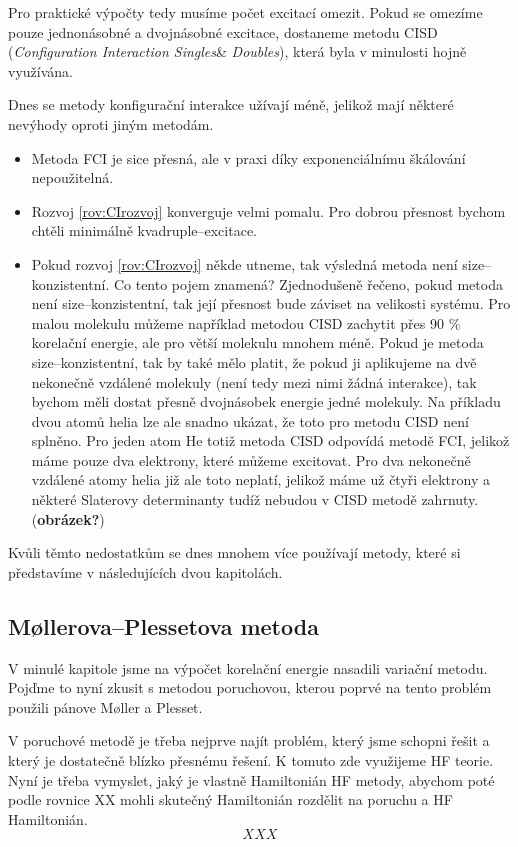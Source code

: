 Pro praktické výpočty tedy musíme počet excitací omezit. Pokud se omezíme pouze jednonásobné a dvojnásobné excitace, dostaneme metodu CISD (\textit{Configuration Interaction Singles}\& \textit{Doubles}), která byla v minulosti hojně využívána.

Dnes se metody konfigurační interakce užívají méně, jelikož mají některé nevýhody oproti jiným metodám. 
\begin{itemize}
\item Metoda FCI je sice přesná, ale v praxi díky exponenciálnímu škálování nepoužitelná.
\item Rozvoj \ref{rov:CIrozvoj} konverguje velmi pomalu. Pro dobrou přesnost bychom chtěli minimálně kvadruple--excitace.
\item Pokud rozvoj \ref{rov:CIrozvoj} někde utneme, tak výsledná metoda není size--konzistentní. Co tento pojem znamená? Zjednodušeně řečeno, pokud metoda není size--konzistentní, tak její přesnost bude záviset na velikosti systému. Pro malou molekulu můžeme například metodou CISD zachytit přes 90 \% korelační energie, ale pro větší molekulu mnohem méně. Pokud je metoda size--konzistentní, tak by také mělo platit, že pokud ji aplikujeme na dvě nekonečně vzdálené molekuly (není tedy mezi nimi žádná interakce), tak bychom měli dostat přesně dvojnásobek energie jedné molekuly. Na příkladu dvou atomů helia lze ale snadno ukázat, že toto pro metodu CISD není splněno. Pro jeden atom He totiž metoda CISD odpovídá metodě FCI, jelikož máme pouze dva elektrony, které můžeme excitovat. Pro dva nekonečně vzdálené atomy helia již ale toto neplatí, jelikož máme už čtyři elektrony a některé Slaterovy determinanty tudíž nebudou v CISD metodě zahrnuty. (\textbf{obrázek?})
\end{itemize}

Kvůli těmto nedostatkům se dnes mnohem více používají metody, které si představíme v následujících dvou kapitolách.

\subsection{M\o llerova--Plessetova metoda}
V minulé kapitole jsme na výpočet korelační energie nasadili variační metodu. Pojďme to nyní zkusit s metodou poruchovou, kterou poprvé na tento problém použili pánove M\o ller a Plesset.

V poruchové metodě je třeba nejprve najít problém, který jsme schopni řešit a který je dostatečně blízko přesnému řešení. K tomuto zde využijeme HF teorie. Nyní je třeba vymyslet, jaký je vlastně Hamiltonián HF metody, abychom poté podle rovnice XX mohli skutečný Hamiltonián rozdělit na poruchu a HF Hamiltonián.
\begin{equation}
XXX
\end{equation}

